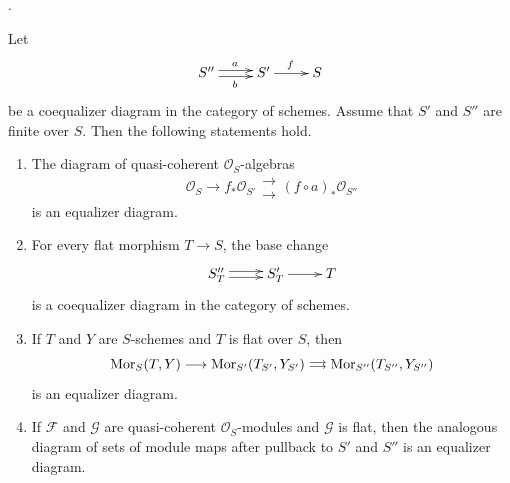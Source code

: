 \begin{lemma}
\label{lemma-finite-coequalizer-flat-base-change}
\begin{reference}
\cite[Expos\'e 190, n\textsuperscript{o} 2(c), pp. 306--307]{FGA}.
\end{reference}
Let
$$
\xymatrix{
S'' \ar@<0.5ex>[r]^a \ar@<-0.5ex>[r]_b &
S' \ar[r]^f & S
}
$$
be a coequalizer diagram in the category of schemes. Assume that $S'$ and
$S''$ are finite over $S$. Then the following statements hold.
\begin{enumerate}
\item The diagram of quasi-coherent $\mathcal{O}_S$-algebras
$$
\mathcal{O}_S \longrightarrow f_*\mathcal{O}_{S'}
\mathrel{\substack{\longrightarrow \\[-0.6ex] \longrightarrow}}
(f \circ a)_*\mathcal{O}_{S''}
$$
is an equalizer diagram.
\item For every flat morphism $T \to S$, the base change
$$
\xymatrix{
S''_T \ar@<0.5ex>[r] \ar@<-0.5ex>[r] & S'_T \ar[r] & T
}
$$
is a coequalizer diagram in the category of schemes.
\item If $T$ and $Y$ are $S$-schemes and $T$ is flat over $S$, then
$$
\mathop{\mathrm{Mor}}\nolimits_S(T, Y) \longrightarrow \mathop{\mathrm{Mor}}\nolimits_{S'}(T_{S'}, Y_{S'})
\mathrel{\substack{\longrightarrow \\[-0.6ex] \longrightarrow}}
\mathop{\mathrm{Mor}}\nolimits_{S''}(T_{S''}, Y_{S''})
$$
is an equalizer diagram.
\item If $\mathcal{F}$ and $\mathcal{G}$ are quasi-coherent
$\mathcal{O}_S$-modules and $\mathcal{G}$ is flat, then the analogous
diagram of sets of module maps after pullback to $S'$ and $S''$ is an
equalizer diagram.
\end{enumerate}
\end{lemma}

